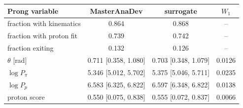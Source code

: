 \begin{tabular}{lccc}
\toprule
Prong variable & MasterAnaDev & surrogate & $W_1$ \\
\midrule
fraction with kinematics & 0.864 & 0.868 & -- \\
fraction with proton fit & 0.739 & 0.742 & -- \\
fraction exiting & 0.132 & 0.126 & -- \\
$\theta$ [rad] & 0.711 [0.358, 1.080] & 0.703 [0.348, 1.079] & 0.0126 \\
$\log P_\pi$ & 5.346 [5.012, 5.702] & 5.375 [5.046, 5.711] & 0.0235 \\
$\log P_p$ & 6.583 [6.325, 6.822] & 6.597 [6.348, 6.822] & 0.0138 \\
proton score & 0.550 [0.075, 0.838] & 0.555 [0.072, 0.837] & 0.0066 \\
\bottomrule
\end{tabular}
